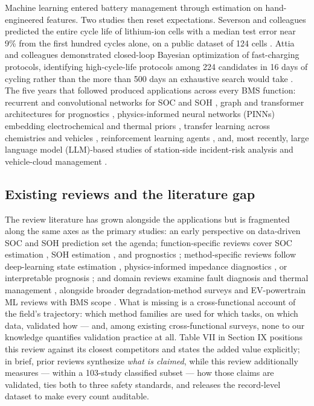 \documentclass[journal]{IEEEtran}
\begin{document}
Machine learning entered battery management through estimation on hand-engineered features. Two studies then reset expectations. Severson and colleagues predicted the entire cycle life of lithium-ion cells with a median test error near 9\% from the first hundred cycles alone, on a public dataset of 124 cells \cite{r3}. Attia and colleagues demonstrated closed-loop Bayesian optimization of fast-charging protocols, identifying high-cycle-life protocols among 224 candidates in 16 days of cycling rather than the more than 500 days an exhaustive search would take \cite{r4}. The five years that followed produced applications across every BMS function: recurrent and convolutional networks for SOC and SOH \cite{r5}\cite{r6}, graph and transformer architectures for prognostics \cite{r7}\cite{r8}, physics-informed neural networks (PINNs) embedding electrochemical and thermal priors \cite{r9}\cite{r10}, transfer learning across chemistries and vehicles \cite{r11}\cite{r12}, reinforcement learning agents \cite{r13}, and, most recently, large language model (LLM)-based studies of station-side incident-risk analysis and vehicle-cloud management \cite{r14}\cite{r15}.

\subsection{Existing reviews and the literature gap}

The review literature has grown alongside the applications but is fragmented along the same axes as the primary studies: an early perspective on data-driven SOC and SOH prediction \cite{r16} set the agenda; function-specific reviews cover SOC estimation \cite{r17}\cite{r18}, SOH estimation \cite{r19}, and prognostics \cite{r20}; method-specific reviews follow deep-learning state estimation \cite{r1}, physics-informed impedance diagnostics \cite{r21}, or interpretable prognosis \cite{r22}; and domain reviews examine fault diagnosis \cite{r23}\cite{r24} and thermal management \cite{r25}, alongside broader degradation-method surveys \cite{r26} and EV-powertrain ML reviews with BMS scope \cite{r27}. What is missing is a cross-functional account of the field's trajectory: which method families are used for which tasks, on which data, validated how --- and, among existing cross-functional surveys, none to our knowledge quantifies validation practice at all. Table VII in Section IX positions this review against its closest competitors and states the added value explicitly; in brief, prior reviews synthesize \textit{what is claimed}, while this review additionally measures --- within a 103-study classified subset --- how those claims are validated, ties both to three safety standards, and releases the record-level dataset to make every count auditable.
\end{document}

